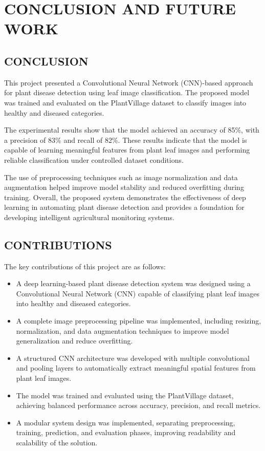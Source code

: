 \documentclass[12pt]{report}
\begin{document}
\chapter{CONCLUSION AND FUTURE WORK}

\section{CONCLUSION}

This project presented a Convolutional Neural Network (CNN)-based approach for plant disease detection using leaf image classification. The proposed model was trained and evaluated on the PlantVillage dataset to classify images into healthy and diseased categories.

The experimental results show that the model achieved an accuracy of 85\%, with a precision of 83\% and recall of 82\%. These results indicate that the model is capable of learning meaningful features from plant leaf images and performing reliable classification under controlled dataset conditions.

The use of preprocessing techniques such as image normalization and data augmentation helped improve model stability and reduced overfitting during training. Overall, the proposed system demonstrates the effectiveness of deep learning in automating plant disease detection and provides a foundation for developing intelligent agricultural monitoring systems.

\section{CONTRIBUTIONS}

The key contributions of this project are as follows:

\begin{itemize}
\item A deep learning-based plant disease detection system was designed using a Convolutional Neural Network (CNN) capable of classifying plant leaf images into healthy and diseased categories.

\item A complete image preprocessing pipeline was implemented, including resizing, normalization, and data augmentation techniques to improve model generalization and reduce overfitting.

\item A structured CNN architecture was developed with multiple convolutional and pooling layers to automatically extract meaningful spatial features from plant leaf images.

\item The model was trained and evaluated using the PlantVillage dataset, achieving balanced performance across accuracy, precision, and recall metrics.

\item A modular system design was implemented, separating preprocessing, training, prediction, and evaluation phases, improving readability and scalability of the solution.
\end{itemize}
\end{document}
